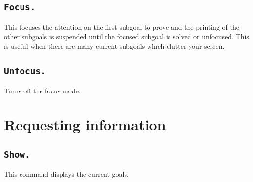 \begin{ErrMsgs}
\item {}
\end{ErrMsgs}

\subsection[\tt Focus.]{\tt Focus.}
This focuses the attention on the first subgoal to prove and the printing
of the other subgoals is suspended until the focused subgoal is
solved or unfocused. This is useful when there are many current
subgoals which clutter your screen.


\subsection[\tt Unfocus.]{\tt Unfocus.}
Turns off the focus mode.


\section{Requesting information}

\subsection[\tt Show.]{\tt Show.\label{Show}}
This command displays the current goals.

